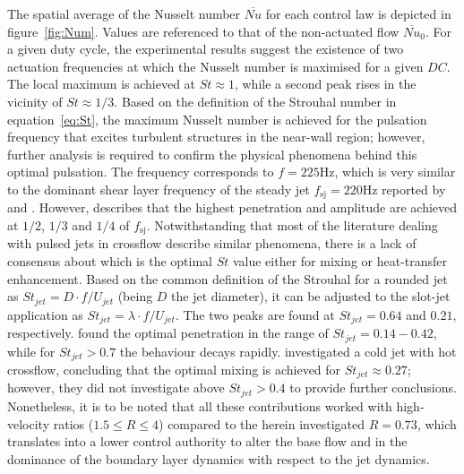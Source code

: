 The spatial average of the Nusselt number $\overline{Nu}$ for each control law is depicted in figure~\ref{fig:Num}. Values are referenced to that of the non-actuated flow $\overline{Nu}_0$. For a given duty cycle, the experimental results suggest the existence of two actuation frequencies at which the Nusselt number is maximised for a given $DC$. The local maximum is achieved at $St \approx 1$, while a second peak rises in the vicinity of $St \approx 1/3$. Based on the definition of the Strouhal number in equation~\ref{eq:St}, the maximum Nusselt number is achieved for the pulsation frequency that excites turbulent structures in the near-wall region; however, further analysis is required to confirm the physical phenomena behind this optimal pulsation. The frequency corresponds to $f=225\mathrm{Hz}$, which is very similar to the dominant shear layer frequency of the steady jet $f_{\mathrm{sj}}=220\mathrm{Hz}$ reported by \citet{MCLOSKEY2002} and \citet{shapiro2006optimization}. However, \citet{MCLOSKEY2002} describes that the highest penetration and amplitude are achieved at $1/2$, $1/3$ and $1/4$ of $f_{\mathrm{sj}}$. Notwithstanding that most of the literature dealing with pulsed jets in crossflow describe similar phenomena, there is a lack of consensus about which is the optimal $St$ value either for mixing or heat-transfer enhancement. Based on the common definition of the Strouhal for a rounded jet as $St_{jet} = D\cdot f/U_{jet}$ (being $D$ the jet diameter), it can be adjusted to the slot-jet application as $St_{jet} = \lambda \cdot f/U_{jet}$. The two peaks are found at $St_{jet} = 0.64$ and $0.21$, respectively. \citet{eroglu2001structure} found the optimal penetration in the range of $St_{jet}=0.14-0.42$, while for $St_{jet} > 0.7$ the behaviour decays rapidly. \citet{vermeulen1992mixing} investigated a cold jet with hot crossflow, concluding that the optimal mixing is achieved for $St_{jet} \approx 0.27$; however, they did not investigate above $St_{jet} > 0.4$ to provide further conclusions. Nonetheless, it is to be noted that all these contributions worked with high-velocity ratios ($1.5 \leq R \leq 4$) compared to the herein investigated $R = 0.73$, which translates into a lower control authority to alter the base flow and in the dominance of the boundary layer dynamics with respect to the jet dynamics.

